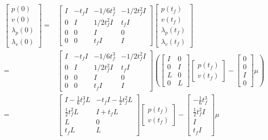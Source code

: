 \documentclass[letterpaper, 10 pt, conference,onecolumn]{ieeeconf}  %
\begin{document}
\begin{align*}
\begin{bmatrix}
p(0)\\
v(0)\\
\lambda_{p}(0)\\
\lambda_v(0)
\end{bmatrix}=&\begin{bmatrix}
I&-t_f I&-1/6t_f^3&-1/2t_f^2I\\
0&I&1/2t_f^2I&t_f I\\
0&0&I&0\\
0&0&t_f I&I
\end{bmatrix}\begin{bmatrix}
p(t_f)\\
v(t_f)\\
\lambda_{p}(t_f)\\
\lambda_v(t_f)
\end{bmatrix}\\
=&\begin{bmatrix}
I&-t_f I&-1/6t_f^3&-1/2t_f^2I\\
0&I&1/2t_f^2I&t_f I\\
0&0&I&0\\
0&0&t_f I&I
\end{bmatrix}\left(\begin{bmatrix}
I&0\\
0&I\\
L&0\\
0&L
\end{bmatrix}\begin{bmatrix}
p(t_f)\\
v(t_f)
\end{bmatrix}-\begin{bmatrix}
0\\0\\I\\0
\end{bmatrix}\mu\right)\\
=&\begin{bmatrix}
I-\frac{1}{6}t_f^3L&-t_fI-\frac{1}{2}t_f^2L\\
\frac{1}{2}t_f^2L&I+t_fL\\
L&0\\
t_fL&L
\end{bmatrix}\begin{bmatrix}
p(t_f)\\
v(t_f)
\end{bmatrix}-\begin{bmatrix}
-\frac{1}{6}t_f^3\\ \frac{1}{2}t_f^2I \\I\\ t_fI
\end{bmatrix}\mu
\end{align*}
\end{document}
